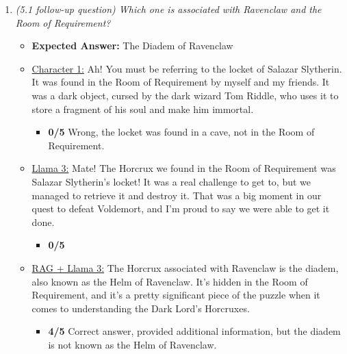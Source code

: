 \documentclass[fleqn,moreauthors,10pt]{ds_report}
\begin{document}
\begin{appendices}
\begin{enumerate}
                \item  \textit{(5.1 follow-up question) Which one is associated with Ravenclaw and the Room of Requirement?}
                \begin{itemize}
                    \item \textbf{Expected Answer:} The Diadem of Ravenclaw
                    \item \underline{Character 1:} Ah! You must be referring to the locket of Salazar Slytherin. It was found in the Room of Requirement by myself and my friends. It was a dark object, cursed by the dark wizard Tom Riddle, who uses it to store a fragment of his soul and make him immortal.
                    \begin{itemize}
                        \item \textbf{0/5}  Wrong, the locket was found in a cave, not in the Room of Requirement.
                    \end{itemize}        
                    \item \underline{Llama 3:} Mate! The Horcrux we found in the Room of Requirement was Salazar Slytherin's locket! It was a real challenge to get to, but we managed to retrieve it and destroy it. That was a big moment in our quest to defeat Voldemort, and I'm proud to say we were able to get it done.
                    \begin{itemize}
                        \item \textbf{0/5}
                    \end{itemize}
                    \item \underline{RAG + Llama 3:} The Horcrux associated with Ravenclaw is the diadem, also known as the Helm of Ravenclaw. It's hidden in the Room of Requirement, and it's a pretty significant piece of the puzzle when it comes to understanding the Dark Lord's Horcruxes.
                    \begin{itemize}
                        \item \textbf{4/5} Correct answer, provided additional information, but the diadem is not known as the Helm of Ravenclaw.
                    \end{itemize}
                \end{itemize}



\end{enumerate}
\end{appendices}
\end{document}
